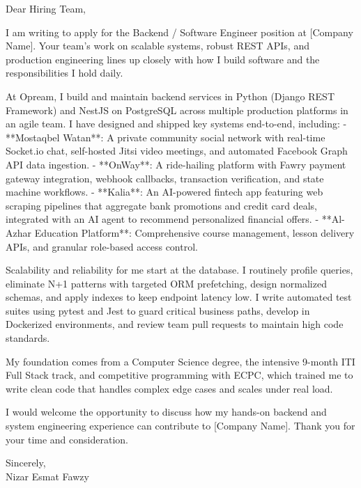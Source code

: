 Dear Hiring Team,

I am writing to apply for the Backend / Software Engineer position at [Company Name].
Your team's work on scalable systems, robust REST APIs, and production engineering lines up closely with how I build software and the responsibilities I hold daily.

At Opream, I build and maintain backend services in Python (Django REST Framework) and NestJS on PostgreSQL across multiple production platforms in an agile team.
I have designed and shipped key systems end-to-end, including:
- **Mostaqbel Watan**: A private community social network with real-time Socket.io chat, self-hosted Jitsi video meetings, and automated Facebook Graph API data ingestion.
- **OnWay**: A ride-hailing platform with Fawry payment gateway integration, webhook callbacks, transaction verification, and state machine workflows.
- **Kalia**: An AI-powered fintech app featuring web scraping pipelines that aggregate bank promotions and credit card deals, integrated with an AI agent to recommend personalized financial offers.
- **Al-Azhar Education Platform**: Comprehensive course management, lesson delivery APIs, and granular role-based access control.

Scalability and reliability for me start at the database.
I routinely profile queries, eliminate N+1 patterns with targeted ORM prefetching, design normalized schemas, and apply indexes to keep endpoint latency low.
I write automated test suites using pytest and Jest to guard critical business paths, develop in Dockerized environments, and review team pull requests to maintain high code standards.

My foundation comes from a Computer Science degree, the intensive 9-month ITI Full Stack track, and competitive programming with ECPC, which trained me to write clean code that handles complex edge cases and scales under real load.

I would welcome the opportunity to discuss how my hands-on backend and system engineering experience can contribute to [Company Name].
Thank you for your time and consideration.

Sincerely,\\
Nizar Esmat Fawzy
